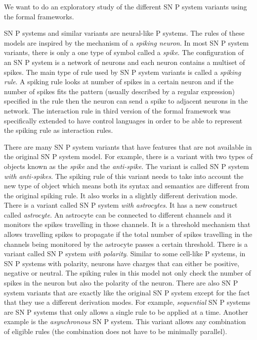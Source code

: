 \documentclass[a4paper]{article}
\theoremstyle{definition}
\begin{document}
We want to do an exploratory study of the different SN P system variants using the formal 
frameworks.

SN P systems and similar variants are neural-like P systems. The rules of these models are inspired 
by the mechanism of a \emph{spiking neuron}. In most SN P system variants, there is only a one type 
of symbol called a \emph{spike}. The configuration of an SN P system is a network of neurons and 
each neuron contains a multiset of spikes. The main type of rule used by SN P system variants is
called a \emph{spiking rule}. A spiking rule looks at number of spikes in a certain neuron and if 
the number of spikes fits the pattern (usually described by a regular expression) specified in the 
rule then the neuron can send a spike to adjacent neurons in the network. The interaction rule in 
third version of the formal framework \cite{verlan-2020-ff-snp} was specifically extended to have 
control languages in order to be able to represent the spiking rule as interaction rules.

There are many SN P system variants that have features that are not available in the original SN P
system model. For example, there is a variant with two types of objects known as the \emph{spike}
and the \emph{anti-spike}. The variant is called SN P system \emph{with anti-spikes}. The spiking
rule of this variant needs to take into account the new type of object which means both its syntax
and semantics are different from the original spiking rule. It also works in a slightly different 
derivation mode. There is a variant called SN P system \emph{with astrocytes}. It has a new 
construct called \emph{astrocyte}. An astrocyte can be connected to different channels and it
monitors the spikes travelling in those channels. It is a threshold mechanism that allows 
travelling spikes to propagate if the total number of spikes travelling in the channels being 
monitored by the astrocyte passes a certain threshold. There is a variant called SN P system
\emph{with polarity}. Similar to some cell-like P systems, in SN P systems with polarity, neurons
have charges that can either be positive, negative or neutral. The spiking rules in this model not
only check the number of spikes in the neuron but also the polarity of the neuron. There are also
SN P system variants that are exactly like the original SN P system except for the fact that they
use a different derivation modes. For example, \emph{sequential} SN P systems are SN P systems that
only allows a single rule to be applied at a time. Another example is the \emph{asynchronous} SN P
system. This variant allows any combination of eligible rules (the combination does not have to be
minimally parallel).
\end{document}
